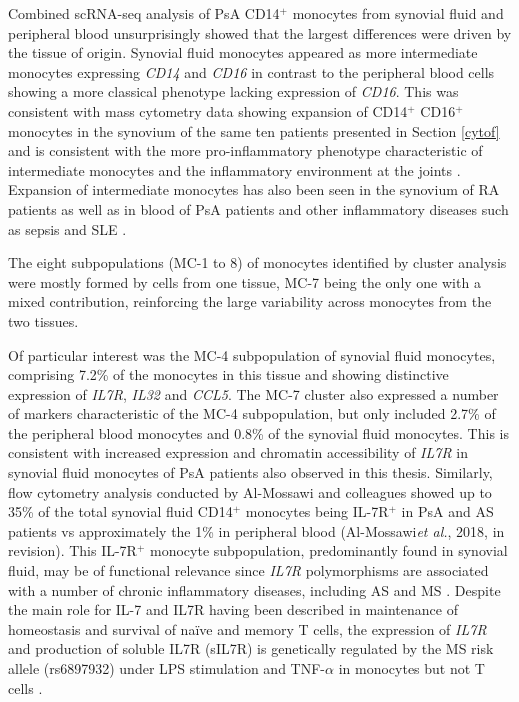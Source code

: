 Combined scRNA-seq analysis of PsA CD14$^+$ monocytes from synovial fluid and peripheral blood unsurprisingly showed that the largest differences were driven by the tissue of origin. Synovial fluid monocytes appeared as more intermediate monocytes expressing \textit{CD14} and \textit{CD16} in contrast to the peripheral blood cells showing a more classical phenotype lacking expression of \textit{CD16}. This was consistent with mass cytometry data showing expansion of CD14$^+$ CD16$^+$ monocytes in the synovium of the same ten patients presented in Section \ref{cytof} and is consistent with the more pro-inflammatory phenotype characteristic of intermediate monocytes and the inflammatory environment at the joints \parencite{Gren2015}. Expansion of intermediate monocytes has also been seen in the synovium of RA patients as well as in blood of PsA patients and other inflammatory diseases such as sepsis and SLE \parencite{Chiu2010,Yoon2014,Mukherjee2015}. 

The eight subpopulations (MC-1 to 8) of monocytes identified by cluster analysis were mostly formed by cells from one tissue, MC-7 being the only one with a mixed contribution, reinforcing the large variability across monocytes from the two tissues. 

Of particular interest was the MC-4 subpopulation of synovial fluid monocytes, comprising 7.2\% of the monocytes in this tissue and showing distinctive expression of \textit{IL7R}, \textit{IL32} and \textit{CCL5}. The MC-7 cluster also expressed a number of markers characteristic of the MC-4 subpopulation, but only included 2.7\% of the peripheral blood monocytes and 0.8\% of the synovial fluid monocytes. This is consistent with increased expression and chromatin accessibility of \textit{IL7R} in synovial fluid monocytes of PsA patients also observed in this thesis. Similarly, flow cytometry analysis conducted by Al-Mossawi and colleagues showed up to 35\% of the total synovial fluid CD14$^+$ monocytes being IL-7R$^+$ in PsA and AS patients vs approximately the 1\% in peripheral blood (Al-Mossawi\textit{et al.}, 2018, in revision). This IL-7R$^+$ monocyte subpopulation, predominantly found in synovial fluid, may be of functional relevance since \textit{IL7R} polymorphisms are associated with a number of chronic inflammatory diseases, including AS and MS \parencite{Gregory2007,Cortes2011}. Despite the main role for IL-7 and IL7R having been described in maintenance of homeostasis and survival of na\"{i}ve and memory T cells, the expression of \textit{IL7R} and production of soluble IL7R (sIL7R) is genetically regulated by the MS risk allele (rs6897932) under LPS stimulation and TNF-$\alpha$ in monocytes but not T cells \parencite{Kondrack2003,Fairfax2014, Al-Mossawi2018}. 

